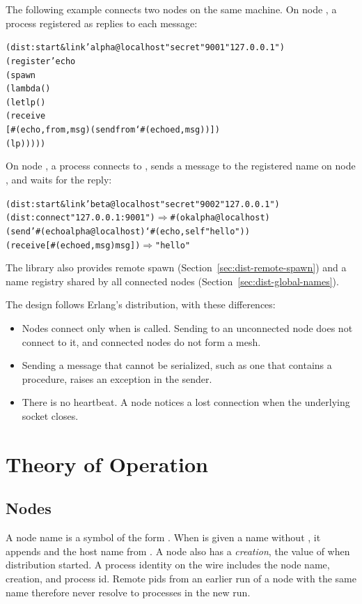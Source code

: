 The following example connects two nodes on the same machine. On node
, a process registered as  replies to each
message:\antipar

\begin{alltt}
(dist:start\&link 'alpha@localhost "secret" 9001 "127.0.0.1")
(register 'echo
  (spawn
   (lambda ()
     (let lp ()
       (receive
        [#(echo ,from ,msg) (send from `#(echoed ,msg))])
       (lp)))))
\end{alltt}

On node , a process connects to , sends a
message to the registered name  on node
, and waits for the reply:\antipar

\begin{alltt}
(dist:start\&link 'beta@localhost "secret" 9002 "127.0.0.1")
(dist:connect "127.0.0.1:9001")         \(\Rightarrow\) #(ok alpha@localhost)
(send '#(echo alpha@localhost) `#(echo ,self "hello"))
(receive [#(echoed ,msg) msg])          \(\Rightarrow\) "hello"
\end{alltt}

The library also provides remote spawn
(Section~\ref{sec:dist-remote-spawn}) and a name registry shared by all
connected nodes (Section~\ref{sec:dist-global-names}).

The design follows Erlang's distribution, with these
differences:\antipar

\begin{itemize}
\item Nodes connect only when  is called. Sending to
  an unconnected node does not connect to it, and connected nodes do
  not form a mesh.
\item Sending a message that cannot be serialized, such as one that
  contains a procedure, raises an exception in the sender.
\item There is no heartbeat. A node notices a lost connection when the
  underlying socket closes.
\end{itemize}

\section {Theory of Operation}

\subsection {Nodes}

A node name is a symbol of the form
. When  is given a
name without , it appends  and the host name from
. A node also has a
\emph{creation}, the value of 
when distribution started. A process identity on the wire includes the
node name, creation, and process id. Remote pids from an earlier run of
a node with the same name therefore never resolve to processes in the
new run.

